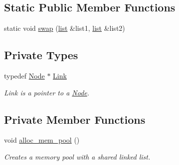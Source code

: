 \subsection*{Static Public Member Functions}
\begin{DoxyCompactItemize}
\item 
static void \hyperlink{classofeli_1_1list_a471424ff8c258a2c00e9246035304cff}{swap} (\hyperlink{classofeli_1_1list}{list} \&list1, \hyperlink{classofeli_1_1list}{list} \&list2)
\end{DoxyCompactItemize}
\subsection*{Private Types}
\begin{DoxyCompactItemize}
\item 
\hypertarget{classofeli_1_1list_a7765ecb875543506d04dbd466f754503}{typedef \hyperlink{structofeli_1_1list_1_1_node}{Node} $\ast$ \hyperlink{classofeli_1_1list_a7765ecb875543506d04dbd466f754503}{Link}}\label{classofeli_1_1list_a7765ecb875543506d04dbd466f754503}

\begin{DoxyCompactList}\small\item\em Link is a pointer to a \hyperlink{structofeli_1_1list_1_1_node}{Node}. \end{DoxyCompactList}\end{DoxyCompactItemize}
\subsection*{Private Member Functions}
\begin{DoxyCompactItemize}
\item 
\hypertarget{classofeli_1_1list_ac969c1209e5bd5b41a8e56e192061aea}{void \hyperlink{classofeli_1_1list_ac969c1209e5bd5b41a8e56e192061aea}{alloc\-\_\-mem\-\_\-pool} ()}\label{classofeli_1_1list_ac969c1209e5bd5b41a8e56e192061aea}

\begin{DoxyCompactList}\small\item\em Creates a memory pool with a shared linked list. \end{DoxyCompactList}\end{DoxyCompactItemize}
